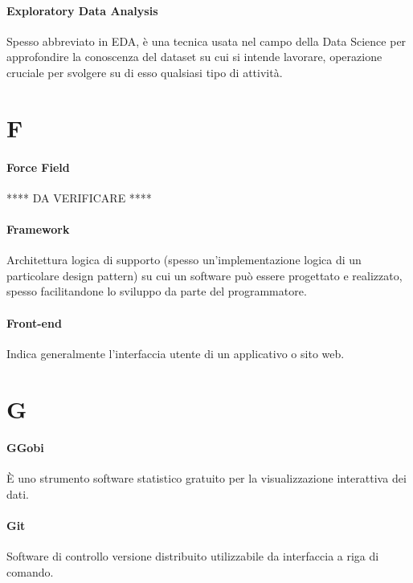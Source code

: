 \documentclass[]{article}
\begin{document}
	\paragraph*{Exploratory Data Analysis}
	Spesso abbreviato in EDA, è una tecnica usata nel campo della Data Science per approfondire la conoscenza del dataset su cui si intende lavorare, operazione cruciale per svolgere su di esso qualsiasi tipo di attività.
	
	
	\newpage
	
	\section*{F}
	
	\paragraph*{Force Field} **** DA VERIFICARE ****
	
	\paragraph*{Framework}
	Architettura logica di supporto (spesso un'implementazione logica di un particolare design pattern) su cui un software può essere progettato e realizzato, spesso facilitandone lo sviluppo da parte del programmatore.
	
	\paragraph*{Front-end}
	Indica generalmente l'interfaccia utente di un applicativo o sito web.
	
	\newpage

	\section*{G}
	
	\paragraph*{GGobi}
	È uno strumento software statistico gratuito per la visualizzazione interattiva dei dati.
	
	\paragraph*{Git}
	Software di controllo versione distribuito utilizzabile da interfaccia a riga di comando.
	
\end{document}
